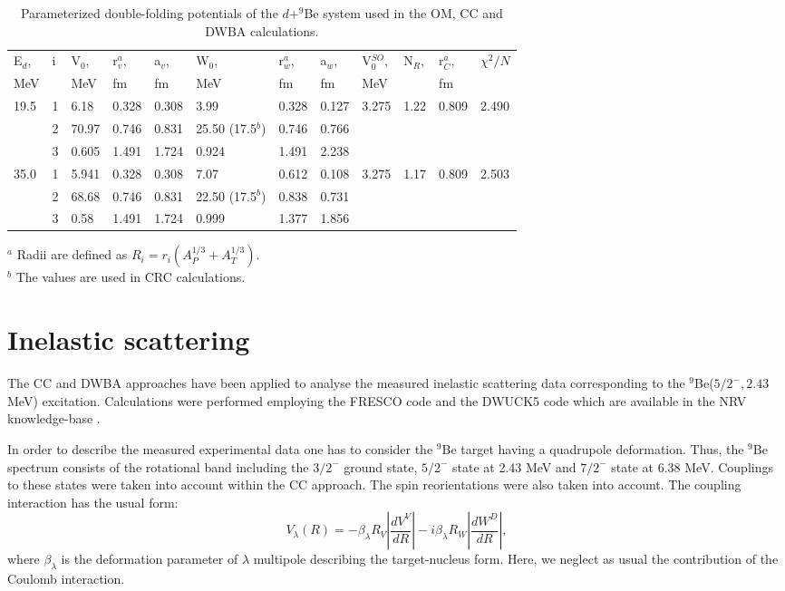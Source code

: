 \documentclass[
12pt, %
oneside, %
english, %
doublespacing, %
doublespacing, %
toctotoc, %
parskip, %
headsepline, %
]{MastersDoctoralThesis} %
\begin{document}
\begin{table*}[bp]
\footnotesize
\caption{\label{dbe_potpar}  Parameterized double-folding potentials of the $d$+$^9$Be system used in the OM, CC and DWBA calculations.}
\begin{tabular*}{\textwidth}{ll@{\extracolsep{\fill}}llllllllll}
\toprule
E$_d$, & i & V$_0$, & r$_v^{a}$, & a$_v$, & W$_0$, & r$_w^{a}$, & a$_w$, & V$_0^{SO}$, & N$_R$, & r$_C^{a}$, & $\chi^2/N$ \\
MeV   &   & MeV   & fm    & fm    & MeV   & fm    & fm    & MeV        &       & fm   						& \\ \midrule
19.5  & 1 & 6.18  & 0.328 & 0.308 & 3.99  & 0.328 & 0.127 & 3.275      & 1.22  & 0.809 			& 	2.490	\\
      & 2 & 70.97 & 0.746 & 0.831 & 25.50 (17.5$^{b}$) & 0.746 & 0.766 &            &       &    						&   \\
      & 3 & 0.605 & 1.491 & 1.724 & 0.924 & 1.491 & 2.238 &            &       &   							&    \\ \midrule
35.0  & 1 & 5.941 & 0.328 & 0.308 & 7.07  & 0.612 & 0.108 & 3.275      & 1.17  & 0.809 			&	2.503\\
      & 2 & 68.68 & 0.746 & 0.831 & 22.50 (17.5$^{b}$)& 0.838 & 0.731 &            &       &       						&\\
      & 3 & 0.58  & 1.491 & 1.724 & 0.999 & 1.377 & 1.856 &            &       &      							& \\ \bottomrule
\end{tabular*}
\scriptsize
$^{a}$ Radii are defined as $R_i = r_i \left( A^{1/3}_P+A^{1/3}_T \right)$.  \\
$^{b}$ The values are used in CRC calculations. \\
\end{table*}


\section{Inelastic scattering}
The CC and DWBA approaches have been applied to analyse the measured inelastic scattering data corresponding to the ${}^9$Be($5/2^-, 2.43$ MeV) excitation. Calculations were performed employing the FRESCO code \cite{fresco} and the DWUCK5 code \cite{kunz} which are available in the NRV knowledge-base \cite{nrv}.

In order to describe the measured experimental data one has to consider the ${}^9$Be target having a quadrupole deformation. Thus, the ${}^9$Be spectrum consists of the rotational band including the  $3/2^-$ ground state, $5/2^-$ state at 2.43 MeV and $7/2^-$ state at 6.38 MeV. Couplings to these states were taken into account within the CC approach. The spin reorientations were also taken into account. The coupling interaction has the usual form:
\begin{equation}
V_\lambda(R)=-\beta_\lambda R_V \left|\frac{d V^V}{dR}\right| - i \beta_\lambda R_W \left|\frac{d W^D}{dR}\right|,
\end{equation}
where $\beta_\lambda$ is the deformation parameter of $\lambda$ multipole describing the target-nucleus form. Here, we neglect as usual the contribution of the Coulomb interaction.
\end{document}
